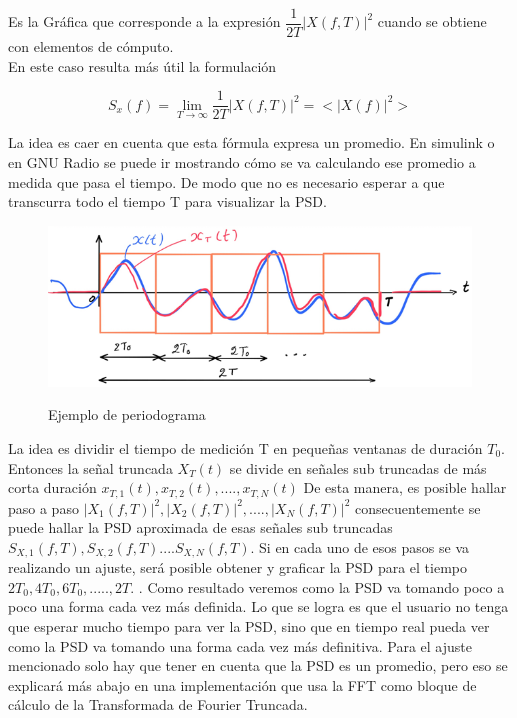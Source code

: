 Es la Gráfica que corresponde a la expresión $\dfrac{1}{2T}|X(f,T)|^{2}$ cuando se obtiene con elementos de cómputo. \\

En este caso resulta más útil la formulación

\begin{equation} \label{equ_treintacuatro}
  S_{x}(f) = \lim_{T \to \infty} \dfrac{1}{2T} |X(f,T)|^{2} = <|X(f)|^{2}> 
\end{equation}

La idea es caer en cuenta que esta fórmula expresa un promedio. En simulink o en GNU Radio se puede ir mostrando cómo se va calculando ese promedio a medida que pasa el tiempo. De modo que no es necesario esperar a que transcurra todo el tiempo T para visualizar la PSD. \\

\begin{figure}[h!]
	\captionsetup{justification = raggedright, singlelinecheck = false}
	\caption{Ejemplo de periodograma} 
	\centering
	\includegraphics[scale=0.8]{Imagenes/Periodograma.png}
	\label{fig:Ejemplo-periodo}
\end{figure}

La idea es dividir el tiempo de medición T en pequeñas ventanas de duración $T_{0}$. Entonces la señal truncada $X_{T}(t)$ se divide en señales sub truncadas de más corta duración $ x_{T,1}(t), x_{T,2}(t), .... , x_{T,N}(t) $ De esta manera, es posible hallar paso a paso $ |X_{1}(f,T)|^{2}, |X_{2}(f,T)|^{2}, .... , |X_{N}(f,T)|^{2} $ consecuentemente se puede hallar la PSD aproximada de esas señales sub truncadas $ S _{X,1}(f,T), S _{X,2}(f,T).... S _{X,N}(f,T)$. Si en cada uno de esos pasos se va realizando un ajuste, será posible obtener y graficar la PSD para el tiempo $ 2T_{0}, 4T_{0}, 6T_{0}, ..... , 2T$. . Como resultado veremos como la PSD va tomando poco a poco una forma cada vez más definida. Lo que se logra es que el usuario no tenga que esperar mucho tiempo para ver la PSD, sino que en tiempo real pueda ver como la PSD va tomando una forma cada vez más definitiva. Para el ajuste mencionado solo hay que tener en cuenta que la PSD es un promedio, pero eso se explicará más abajo en una implementación que usa la FFT como bloque de cálculo de la Transformada de Fourier Truncada. \\

